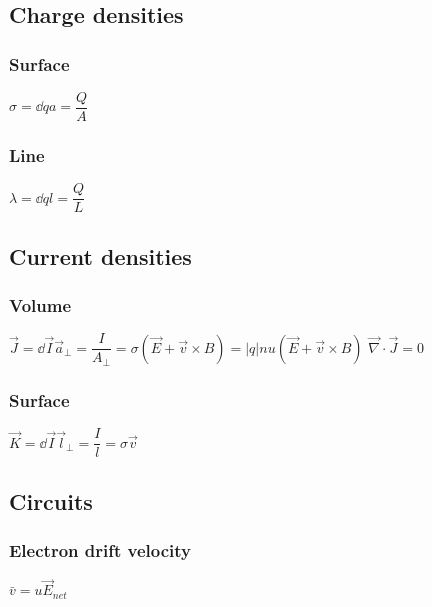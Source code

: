 		\subsection{Charge densities}
        
\subsubsection{Surface}
\begin{itemize}
\itemt \( \sigma = \dd{q}{a} = \dfrac{Q}{A} \)
\end{itemize}
\subsubsection{Line}
\begin{itemize}
\itemt \( \lambda = \dd{q}{l} = \dfrac{Q}{L} \) 
\end{itemize}

		\subsection{Current densities}
        
\subsubsection{Volume}
\begin{itemize}
\itemt \( \vec{J} = \dd{\vec{I}}{\vec{a}_\perp} = \dfrac{I}{A_\perp} = \sigma(\vec{E}+\vec{v}\times B) = |q|nu (\vec{E}+\vec{v}\times B)\)
\itemt \( \vec{\nabla} \cdot \vec{J} = 0 \)
\end{itemize}

\subsubsection{Surface}
\begin{itemize}
\itemt \( \vec{K} = \dd{\vec{I}}{\vec{l}_\perp} = \dfrac{I}{l} = \sigma \vec{v}\)
\end{itemize}




		\subsection{Circuits}

\subsubsection{Electron drift velocity}
\begin{itemize}
\itemt \( \bar{v} = u\vec{E}_{net} \)
\end{itemize}	

